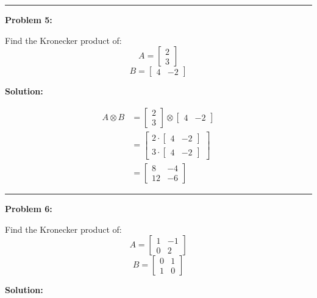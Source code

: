 \documentclass[
  letterpaper,
  DIV=11,
  numbers=noendperiod]{scrreprt}
\theoremstyle{plain}
\theoremstyle{definition}
\theoremstyle{remark}
\begin{document}
\begin{center}\rule{0.5\linewidth}{0.5pt}\end{center}

\textbf{Problem 5:}

Find the Kronecker product of: \[A=\begin{bmatrix}2\\3\end{bmatrix}\]
\[B=\begin{bmatrix}4&-2\end{bmatrix}\]

\textbf{Solution:}

\begin{align*}
A \otimes B &= \begin{bmatrix}2\\3\end{bmatrix} \otimes \begin{bmatrix}4&-2\end{bmatrix} \\
&= \begin{bmatrix}
2 \cdot \begin{bmatrix}4&-2\end{bmatrix} \\
3 \cdot \begin{bmatrix}4&-2\end{bmatrix}
\end{bmatrix} \\
&= \begin{bmatrix}
8 & -4 \\
12 & -6
\end{bmatrix}
\end{align*}

\begin{center}\rule{0.5\linewidth}{0.5pt}\end{center}

\textbf{Problem 6:}

Find the Kronecker product of:
\[A=\begin{bmatrix}1&-1\\0&2\end{bmatrix}\]
\[B=\begin{bmatrix}0&1\\1&0\end{bmatrix}\]

\textbf{Solution:}
\end{document}

